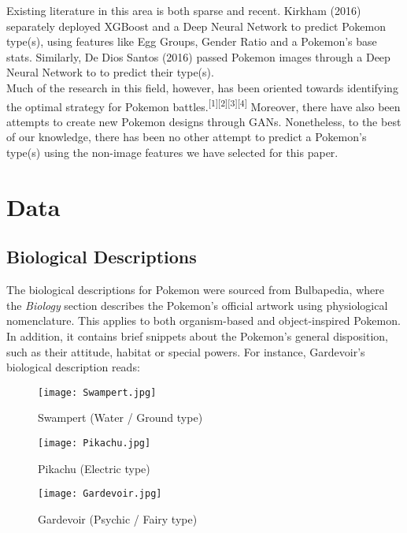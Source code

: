 \documentclass{winnower}
\begin{document}
Existing literature in this area is both sparse and recent. Kirkham (2016) separately deployed XGBoost and a Deep Neural Network to predict Pokemon type(s), using features like Egg Groups, Gender Ratio and a Pokemon's base stats. Similarly, De Dios Santos (2016) passed Pokemon images through a Deep Neural Network to to predict their type(s). \\

Much of the research in this field, however, has been oriented towards identifying the optimal strategy for Pokemon battles.\textsuperscript{[1][2][3][4]} Moreover, there have also been attempts to create new Pokemon designs through GANs. Nonetheless, to the best of our knowledge, there has been no other attempt to predict a Pokemon's type(s) using the non-image features we have selected for this paper.

\section{Data}
\subsection{Biological Descriptions}

The biological descriptions for Pokemon were sourced from Bulbapedia, where the \emph{Biology} section describes the Pokemon's official artwork using physiological nomenclature. This applies to both organism-based and object-inspired Pokemon. In addition, it contains brief snippets about the Pokemon's general disposition, such as their attitude, habitat or special powers. For instance, Gardevoir's biological description reads:

\begin{figure*}
\begin{center}
\begin{minipage}[b]{0.3\textwidth}
\texttt{[image: Swampert.jpg]}\vspace{0cm}
\caption
{Swampert (Water / Ground type)}
\end{minipage}
\hfill
\begin{minipage}[b]{0.3\textwidth}
\texttt{[image: Pikachu.jpg]}\vspace{0cm}
\caption
{Pikachu (Electric type) }
\end{minipage}
\hfill
\begin{minipage}[b]{0.3\textwidth}
\texttt{[image: Gardevoir.jpg]}\vspace{0cm}
\caption
{Gardevoir (Psychic / Fairy type)}
\end{minipage}
\end{center}
\end{figure*}
\end{document}
